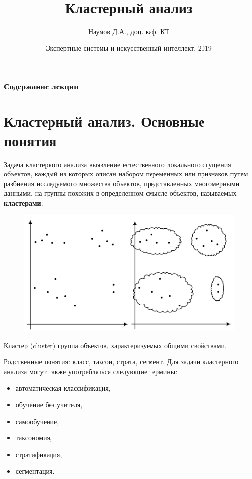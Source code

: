 \documentclass{beamer}
\title[Artifical Intelligence]{Кластерный анализ}
\author{Наумов Д.А., доц. каф. КТ}
\date[04.12.2019] {Экспертные системы и искусственный интеллект, 2019}
\begin{document}
\begin{frame}
  \titlepage
\end{frame}
  
\begin{frame}
  \frametitle{Содержание лекции}
  \tableofcontents  
\end{frame}

\section{Кластерный анализ. Основные понятия}

\begin{frame}
	\begin{block}{Задача кластерного анализа}
		выявление естественного локального сгущения объектов, каждый из которых 	описан набором переменных или признаков путем разбиения исследуемого множества       объектов, представленных многомерными данными, на группы похожих в определенном смысле объектов, называемых \textbf{кластерами}.
	\end{block}
	\begin{figure}[h]
		\centering
		\includegraphics[scale=0.35]{images/lec07-pic01.png}
	\end{figure}
\end{frame}

\begin{frame}
	\begin{block}{Кластер (cluster)}
		группа объектов, характеризуемых общими свойствами.
	\end{block}
	Родственные понятия: класс, таксон, страта, сегмент. 
	\medskip
	Для задачи кластерного анализа могут также употребляться следующие термины: 
	\begin{itemize}
		\item автоматическая классификация, 
		\item обучение без учителя, 
		\item самообучение, 
		\item таксономия, 
		\item стратификация, 
		\item сегментация.
	\end{itemize}	
\end{frame}
\end{document}
